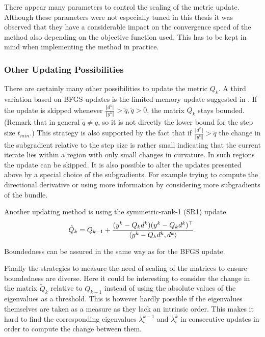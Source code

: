 
\begin{remark}
	There appear many parameters to control the scaling of the metric update. Although these parameters were not especially tuned in this thesis it was observed that they have a considerable impact on the convergence speed of the method also depending on the objective function used. This has to be kept in mind when implementing the method in practice.
\end{remark}

\subsubsection{Other Updating Possibilities}

There are certainly many other possibilities to update the metric \(Q_k\). A third variation based on BFGS-updates is the limited memory update suggested in \cite{Nocedal1980}. If the update is skipped whenever \(\frac{\Vert d^k\Vert}{\Vert y^k\Vert}> \tilde{q}, \tilde{q}>0\), the matrix \(Q_k\) stays bounded. (Remark that in general \(\tilde{q}\neq q\), so it is not directly the lower bound for the step size \(t_{min}\).) This strategy is also supported by the fact that if \(\frac{\Vert d^k\Vert}{\Vert y^k\Vert}> \tilde{q}\) the change in the subgradient relative to the step size
is rather small indicating that the current iterate lies within a region with only small changes in curvature. In such regions the update can be skipped.
It is also possible to alter the updates presented above by a special choice of the subgradients. For example trying to compute the directional derivative or using more information by considering more subgradients of the bundle.
 
Another updating method is using the symmetric-rank-1 (SR1) update
\[ \tilde{Q}_k = Q_{k-1}+\frac{(y^k-Q_kd^k)(y^k-Q_kd^k)^{\top}}{\left\langle y^k-Q_kd^k,d^k \right\rangle}. \]

Boundedness can be assured in the same way as for the BFGS update.

Finally the strategies to measure the need of scaling of the matrices to ensure boundedness are diverse. Here it could be interesting to consider the change in the matrix \(\tilde{Q}_k\) relative to \(Q_{k-1}\) instead of using the absolute values of the eigenvalues as a threshold.
This is however hardly possible if the eigenvalues themselves are taken as a measure as they lack an intrinsic order. This makes it hard to find the corresponding eigenvalues \(\lambda^{k-1}_i\) and \(\lambda^k_i\) in consecutive updates in order to compute the change between them.

